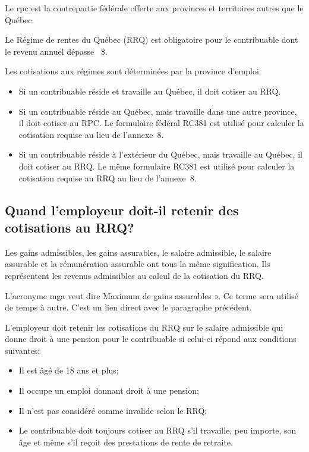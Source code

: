 Le \acrfull{rpc} est la contrepartie fédérale offerte aux provinces et territoires autres que le Québec. 

Le Régime de rentes du Québec (RRQ) est obligatoire pour le contribuable dont le revenu annuel dépasse ~\$.

Les cotisations aux régimes sont déterminées par la province d'emploi.
\begin{itemize}
	\item Si un contribuable réside et travaille au Québec, il doit cotiser au RRQ.
	\item Si un contribuable réside au Québec, mais travaille dans une autre province, il doit cotiser au RPC. Le formulaire fédéral RC381 est utilisé pour calculer la cotisation requise au lieu de l'annexe~8.
	\item Si un contribuable réside à l'extérieur du Québec, mais travaille au Québec, il doit cotiser au RRQ. Le même formulaire RC381 est utilisé pour calculer la cotisation requise au RRQ au lieu de l'annexe~8.
\end{itemize}


\subsection{Quand l'employeur doit-il retenir des cotisations au RRQ?}
\begin{note}
	Les gains admissibles, les gains assurables, le salaire admissible, le salaire assurable et la rémunération assurable ont tous la même signification. Ils représentent les revenus admissibles au calcul de la cotisation du RRQ.
	
	
	L'acronyme \acrshort{mga} veut dire \og Maximum de gains assurables ». Ce terme sera utilisé de temps à autre. C'est un lien direct avec le paragraphe précédent.
\end{note}

L'employeur doit retenir les cotisations du RRQ sur le salaire admissible qui donne droit à une pension pour le contribuable si celui-ci répond aux conditions suivantes:
\begin{itemize}
	\item Il est âgé de 18 ans et plus;
	\item Il occupe un emploi donnant droit à une pension;
	\item Il n'est pas considéré comme invalide selon le RRQ;
	\item Le contribuable doit toujours cotiser au RRQ s'il travaille, peu importe, son âge et même s'il reçoit des prestations de rente de retraite.
\end{itemize}

